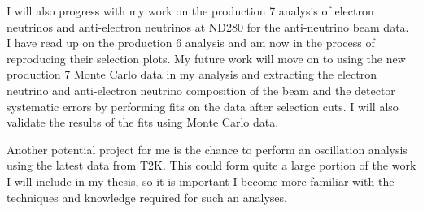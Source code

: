 \documentclass[aps,pra,12pt,notitlepage,tightenlines]{revtex4-1}
\begin{document}
I will also progress with my work on the production 7 analysis of electron neutrinos and anti-electron neutrinos at ND280 for the anti-neutrino beam data. I have read up on the production 6 analysis and am now in the process of reproducing their selection plots. My future work will move on to using the new production 7 Monte Carlo data in my analysis and extracting the electron neutrino and anti-electron neutrino composition of the beam and the detector systematic errors by performing fits on the data after selection cuts. I will also validate the results of the fits using Monte Carlo data.

Another potential project for me is the chance to perform an oscillation analysis using the latest data from T2K. This could form quite a large portion of the work I will include in my thesis, so it is important I become more familiar with the techniques and knowledge required for such an analyses.




\end{document}
